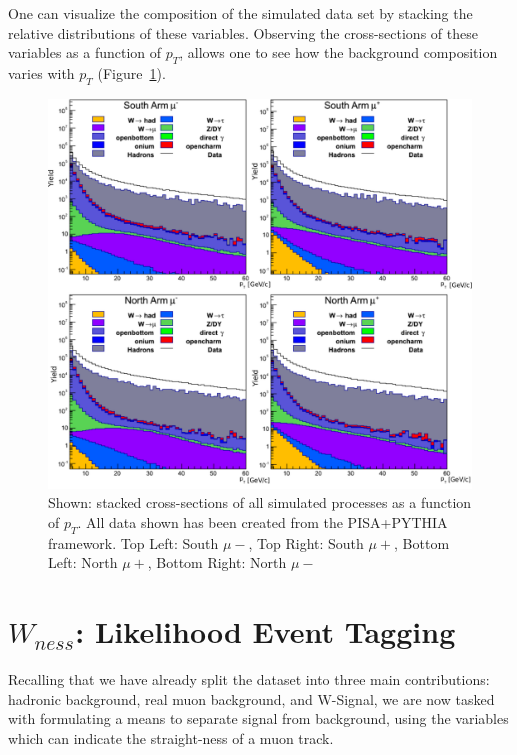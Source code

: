 One can visualize the composition of the simulated data set by stacking the
relative distributions of these variables. Observing the cross-sections of these
variables as a function of $p_T$, allows one to see how the background
composition varies with $p_T$ (Figure~\ref{fig:stacked_xsec_sim}).

\begin{figure}[ht]
  \centering
  \includegraphics[width=\linewidth]{./figures/stacked_xsec.png}
  \caption{
    Shown: stacked cross-sections of all simulated processes as a
    function of $p_T$. All data shown has been created from the PISA+PYTHIA
    framework. Top Left: South $\mu-$, Top Right: South $\mu+$, Bottom Left:
    North $\mu+$, Bottom Right: North $\mu-$~\cite{Seidl2014a}
  }
  \label{fig:stacked_xsec_sim}
\end{figure}

\clearpage


\section{$W_{ness}$: Likelihood Event Tagging}
\label{sec:likelihood}

Recalling that we have already split the dataset into three main contributions:
hadronic background, real muon background, and W-Signal, we are now tasked with
formulating a means to separate signal from background, using the variables
which can indicate the straight-ness of a muon track.

